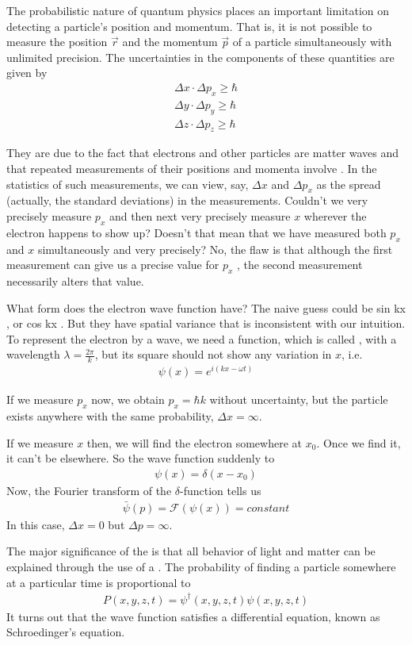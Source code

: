 The probabilistic nature of quantum physics places an important limitation on detecting a particle’s position and momentum. That is, it is not possible to measure the position $\vec{r}$ and the momentum $\vec{p}$ of a particle simultaneously with unlimited precision. The uncertainties
in the components of these quantities are given by
\begin{align*}
    \Delta x\cdot \Delta p_x \ge \hbar\\
    \Delta y\cdot \Delta p_y \ge \hbar\\
    \Delta z\cdot \Delta p_z \ge \hbar
\end{align*}

They are due to the fact that electrons and other particles are matter waves and that repeated measurements of their positions and momenta involve . In the statistics of such measurements, we can view, say, $\Delta x$ and $\Delta p_x$ as the spread (actually, the standard deviations) in the measurements. Couldn’t we very precisely measure $p_x$ and then next very precisely measure $x$ wherever the electron happens to show up? Doesn’t that mean that we have measured both $p_x$ and $x$ simultaneously and very precisely? No, the flaw is that although the first measurement can give us a precise value for $p_x$ , the second measurement necessarily alters that value. 

What form does the electron wave function have? The naive guess could be sin kx , or cos kx . But they have spatial variance that is inconsistent with our intuition. To represent the electron by a wave, we need a function, which is called , with a wavelength $\lambda=\frac{2\pi}{k}$, but its square should not show any variation in $x$, i.e.
\begin{align*}
    \psi(x)=e^{i(kx-\omega t)}
\end{align*}

If we measure $p_x$ now, we obtain $p_x=\hbar k$ without uncertainty, but the particle exists anywhere with the same probability, $\Delta x=\infty$.

If we measure $x$ then, we will find the electron somewhere at $x_0$. Once we find it, it can't be elsewhere. So the wave function suddenly  to
\begin{align*}
    \psi(x)=\delta(x-x_0)
\end{align*}
Now, the Fourier transform of the $\delta$-function tells us 
\begin{align*}
    \bar{\psi}(p)=\mathcal{F} (\psi(x))=constant
\end{align*}
In this case, $\Delta x=0$ but $\Delta p=\infty$. 

The major significance of the  is that all behavior of light and matter can be explained through the use of a . The probability of finding a particle somewhere at a particular time is proportional to
\begin{align*}
    P(x,y,z,t)=\psi^{\dagger}(x,y,z,t)\psi(x,y,z,t)
\end{align*}
It turns out that the wave function satisfies a differential equation, known as Schroedinger's equation.
